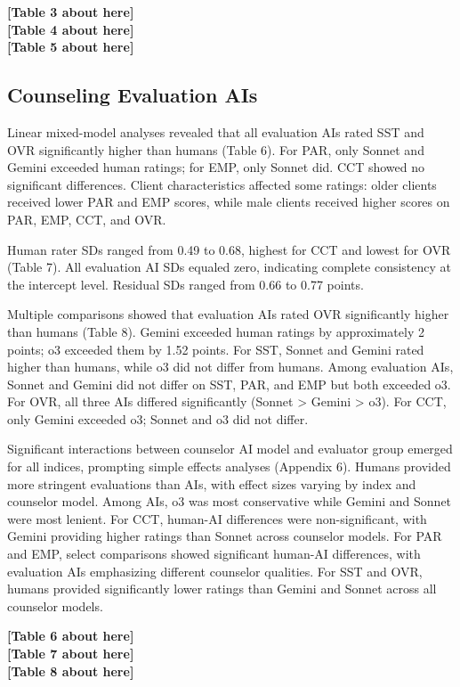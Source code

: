 \documentclass{wiley-article}
\begin{document}
\begin{center}
\textbf{[Table 3 about here]}\\
\textbf{[Table 4 about here]}\\
\textbf{[Table 5 about here]}
\end{center}

\subsection*{Counseling Evaluation AIs}

Linear mixed-model analyses revealed that all evaluation AIs rated SST and OVR significantly higher than humans (Table 6). For PAR, only Sonnet and Gemini exceeded human ratings; for EMP, only Sonnet did. CCT showed no significant differences. Client characteristics affected some ratings: older clients received lower PAR and EMP scores, while male clients received higher scores on PAR, EMP, CCT, and OVR.

Human rater SDs ranged from 0.49 to 0.68, highest for CCT and lowest for OVR (Table 7). All evaluation AI SDs equaled zero, indicating complete consistency at the intercept level. Residual SDs ranged from 0.66 to 0.77 points.

Multiple comparisons showed that evaluation AIs rated OVR significantly higher than humans (Table 8). Gemini exceeded human ratings by approximately 2 points; o3 exceeded them by 1.52 points. For SST, Sonnet and Gemini rated higher than humans, while o3 did not differ from humans. Among evaluation AIs, Sonnet and Gemini did not differ on SST, PAR, and EMP but both exceeded o3. For OVR, all three AIs differed significantly (Sonnet > Gemini > o3). For CCT, only Gemini exceeded o3; Sonnet and o3 did not differ.

Significant interactions between counselor AI model and evaluator group emerged for all indices, prompting simple effects analyses (Appendix 6). Humans provided more stringent evaluations than AIs, with effect sizes varying by index and counselor model. Among AIs, o3 was most conservative while Gemini and Sonnet were most lenient. For CCT, human-AI differences were non-significant, with Gemini providing higher ratings than Sonnet across counselor models. For PAR and EMP, select comparisons showed significant human-AI differences, with evaluation AIs emphasizing different counselor qualities. For SST and OVR, humans provided significantly lower ratings than Gemini and Sonnet across all counselor models.

\begin{center}
\textbf{[Table 6 about here]}\\
\textbf{[Table 7 about here]}\\
\textbf{[Table 8 about here]}
\end{center}
\end{document}
